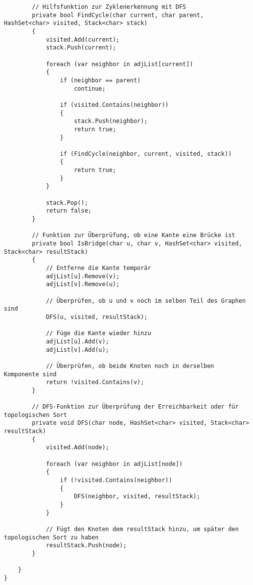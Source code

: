 \documentclass[a4paper,10pt,ngerman]{scrartcl}
\begin{document}
\begin{verbatim}
        // Hilfsfunktion zur Zyklenerkennung mit DFS
        private bool FindCycle(char current, char parent, HashSet<char> visited, Stack<char> stack)
        {
            visited.Add(current);
            stack.Push(current);

            foreach (var neighbor in adjList[current])
            {
                if (neighbor == parent)
                    continue;

                if (visited.Contains(neighbor))
                {
                    stack.Push(neighbor);
                    return true;
                }

                if (FindCycle(neighbor, current, visited, stack))
                {
                    return true;
                }
            }

            stack.Pop();
            return false;
        }

        // Funktion zur Überprüfung, ob eine Kante eine Brücke ist
        private bool IsBridge(char u, char v, HashSet<char> visited, Stack<char> resultStack)
        {
            // Entferne die Kante temporär
            adjList[u].Remove(v);
            adjList[v].Remove(u);

            // Überprüfen, ob u und v noch im selben Teil des Graphen sind
            DFS(u, visited, resultStack);

            // Füge die Kante wieder hinzu
            adjList[u].Add(v);
            adjList[v].Add(u);

            // Überprüfen, ob beide Knoten noch in derselben Komponente sind
            return !visited.Contains(v);
        }

        // DFS-Funktion zur Überprüfung der Erreichbarkeit oder für topologischen Sort
        private void DFS(char node, HashSet<char> visited, Stack<char> resultStack)
        {
            visited.Add(node);

            foreach (var neighbor in adjList[node])
            {
                if (!visited.Contains(neighbor))
                {
                    DFS(neighbor, visited, resultStack);
                }
            }

            // Fügt den Knoten dem resultStack hinzu, um später den topologischen Sort zu haben
            resultStack.Push(node);
        }

    }
}
\end{verbatim}
\end{document}
